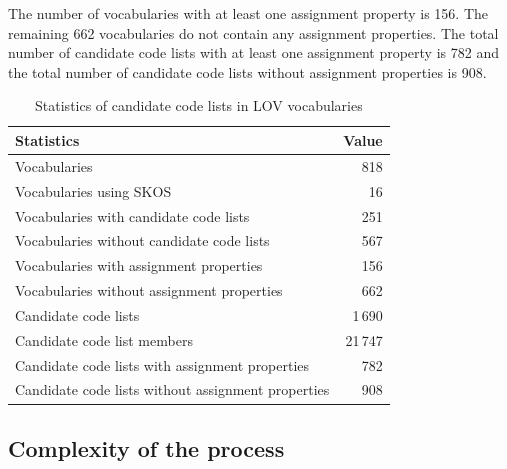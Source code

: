 The number of vocabularies with at least one assignment property is 156. The remaining 662 vocabularies do not contain any assignment properties. The total number of candidate code lists with at least one assignment property is 782 and the total number of candidate code lists without assignment properties is 908.

\begin{table}[h]
\footnotesize
\centering
\begin{tabular}{|l|r|}
\hline
\textbf{Statistics}                                         & \textbf{Value} \\ \hline
Vocabularies                                                & 818            \\ \hline
Vocabularies using SKOS                                     & 16             \\ \hline
Vocabularies with candidate code lists                      & 251            \\ \hline
Vocabularies without candidate code lists                   & 567            \\ \hline
Vocabularies with assignment properties                     & 156            \\ \hline
Vocabularies without assignment properties                  & 662            \\ \hline
Candidate code lists                                        & 1\,690         \\ \hline
Candidate code list members                                 & 21\,747        \\ \hline
Candidate code lists with assignment properties             & 782            \\ \hline
Candidate code lists without assignment properties          & 908            \\ \hline
\end{tabular}
\caption{Statistics of candidate code lists in LOV vocabularies}
\label{tab:lov-code-list-stats} 
\end{table}

\subsection{Complexity of the process}

